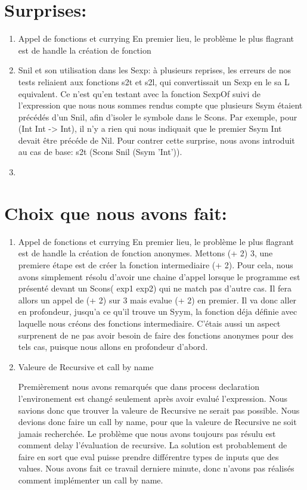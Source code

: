 \documentclass{article}
\begin{document}
\section*{Surprises:}
\begin{enumerate}
    \item Appel de fonctions et currying
    En premier lieu, le problème le plus flagrant est de handle la création de fonction

    \item Snil et son utilisation dans les Sexp:
    à plusieurs reprises, les erreurs de nos tests reliaient aux fonctions s2t et s2l, qui convertissait un Sexp en le sa L equivalent. Ce n'est qu'en testant avec la fonction SexpOf suivi de l'expression que nous nous sommes rendus compte que plusieurs Ssym étaient précédés d'un Snil, afin d'isoler le symbole dans le Scons. Par exemple, pour (Int Int -> Int), il n'y a rien qui nous indiquait que le premier Ssym Int devait être précéde de Nil. Pour contrer cette surprise, nous avons introduit au cas de base: s2t (Scons Snil (Ssym 'Int')). 

    \item
    

\end{enumerate}

\section*{Choix que nous avons fait:}
\begin{enumerate}
    \item Appel de fonctions et currying
    En premier lieu, le problème le plus flagrant est de handle la création de fonction anonymes. Mettons (+ 2) 3, une premiere étape est de créer la fonction intermediaire (+ 2). Pour cela, nous avons simplement résolu d'avoir une chaine d'appel lorsque le programme est présenté devant un Scons( exp1 exp2) qui ne match pas d'autre cas. Il fera allors un appel de (+ 2) sur 3 mais evalue (+ 2) en premier. Il va donc aller en profondeur, jusqu'a ce qu'il trouve un Syym, la fonction déja définie avec laquelle nous créons des fonctions intermediaire. C'étais aussi un aspect surprenent de ne pas avoir besoin de faire des fonctions anonymes pour des tels cas, puisque nous allons en profondeur d'abord.
    \item Valeure de Recursive et call by name


    Premièrement nous avons remarqués que dans process declaration l'environement est changé seulement après avoir evalué l'expression. Nous savions donc que trouver la valeure de Recursive ne serait pas possible. Nous devions donc faire un call by name, pour que la valeure de Recursive ne soit jamais recherchée. Le problème que nous avons toujours pas résulu est comment delay l'évaluation de recursive. La solution est probablement de faire en sort que eval puisse prendre différentre types de inputs que des values. Nous avons fait ce travail derniere minute, donc n'avons pas réalisés comment implémenter un call by name.
    

    
\end{enumerate}
\end{document}
